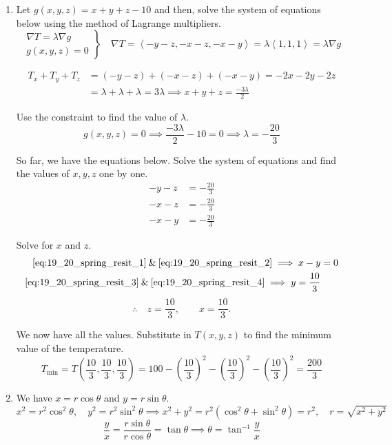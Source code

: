 \documentclass[a4paper, 12pt]{article}
\begin{document}
\begin{enumerate}[leftmargin=*,label=\textbf{\arabic*.}]
\item Let $g(x,y,z)=x+y+z-10$ and then, solve the system of equations below using the method of Lagrange multipliers.
\[
\left.
\begin{array}{ll}
\nabla T =\lambda \nabla g\\[1em]
g(x,y,z) = 0
\end{array}
\right\}\quad
\nabla T = \left\langle-y-z,-x-z,-x-y\right\rangle=\lambda\left\langle1,1,1\right\rangle= \lambda\nabla g
\]

\vspace{-1em}
\begin{align*}T_x+T_y + T_z&=(-y-z) +(-x-z) +(-x-y)=-2x-2y-2z\\[1em]&=\lambda+\lambda+\lambda=3\lambda\implies x+y+z=\frac{-3\lambda}{2}\end{align*}

Use the constraint to find the value of $\lambda$.
\[g(x,y,z) = 0 \implies \frac{-3\lambda}{2}-10=0\implies \lambda=-\frac{20}{3}\]

So far, we have the equations below. Solve the system of equations and find the values of $x,y,z$ one by one.
\begin{align}
-y-z &= -\frac{20}{3}
\label{eq:19_20_spring_resit_1}\\
-x-z &= -\frac{20}{3}
\label{eq:19_20_spring_resit_2}\\
-x-y &= -\frac{20}{3}
\label{eq:19_20_spring_resit_3}
\end{align}

Solve for $x$ and $z$.
\begin{align}
\eqref{eq:19_20_spring_resit_1} \:\&\:
\eqref{eq:19_20_spring_resit_2}
\implies x-y &= 0
\label{eq:19_20_spring_resit_4}\\
\eqref{eq:19_20_spring_resit_3} \:\&\:
\eqref{eq:19_20_spring_resit_4}
\implies y = \frac{10}{3}
\label{eq:19_20_spring_resit_5}\nonumber
\end{align}
\[\therefore\quad z=\frac{10}{3},\qquad x=\frac{10}{3}.\]

We now have all the values. Substitute in $T(x,y,z)$ to find the minimum value of the temperature.
\[T_{\text{min}}=T\left(\frac{10}{3},\frac{10}{3},\frac{10}{3}\right)=100-\left(\frac{10}{3}\right)^2-\left(\frac{10}{3}\right)^2-\left(\frac{10}{3}\right)^2=\boxed{\frac{200}{3}}\]

\item We have $x=r\cos\theta$ and $y=r\sin\theta$.
\[x^2=r^2\cos^2\theta,\quad y^2 =r^2\sin^2\theta\implies x^2+y^2=r^2\left(\cos^2\theta+\sin^2\theta\right)=r^2, \quad r=\sqrt{x^2+y^2}\]
\[\frac{y}{x}=\frac{r\sin\theta}{r\cos\theta}=\tan\theta \implies \theta=\tan^{-1}\frac{y}{x}\]


\end{enumerate}
\end{document}
